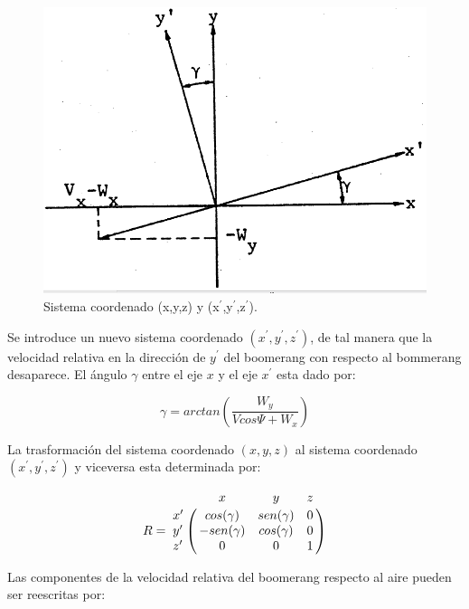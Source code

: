 		\begin{figure}[ht]
		\begin{center}
		\includegraphics[scale=0.4]{imagenes/3-boomerang/vel_vient.png}
		\caption{Sistema coordenado (x,y,z) y (x$^\prime$,y$^\prime$,z$^\prime$).}
		\label{fig13}
		\end{center}
		\end{figure}

	Se introduce un nuevo sistema coordenado $(x^{\prime},y^{\prime},z^{\prime})$, de tal manera que la velocidad relativa en la dirección de $y^{\prime}$ del boomerang con respecto al bommerang desaparece. El ángulo $\gamma$ entre el eje $x$ y el eje $x^{\prime}$ esta dado por:

		\begin{equation}
		\gamma = arctan(\frac{W_{y}}{Vcos{\Psi}+W_{x}})
		\label{ec54}
		\end{equation}

	La trasformación del sistema coordenado $(x,y,z)$ al sistema coordenado $(x^{\prime},y^{\prime},z^{\prime})$ y viceversa esta determinada por:

		\begin{equation}
    	R = \bordermatrix{~ & x & y & z \cr
        x^{\prime} & cos(\gamma) & sen(\gamma) & 0 \cr
        y^{\prime} & -sen(\gamma) &  cos(\gamma) & 0 \cr
        z^{\prime} & 0       &  0       & 1 \cr }
    	\label{ec55}
    	\end{equation}

    Las componentes de la velocidad relativa del boomerang respecto al aire pueden ser reescritas por:


